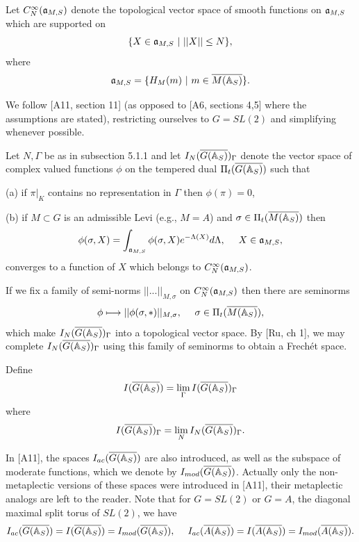 Let $C_N^\infty({\frak{a}}_{M,S})$ denote the topological vector space of
smooth functions on ${\frak{a}}_{M,S}$ which are supported on
\[
\{X\in {\frak{a}}_{M,S}\ |\ ||X||\leq N\},
\]
where
\begin{equation}
{\frak{a}}_{M,S}
=\{H_M(m)\ |\ m\in \overline{M({\Bbb{A}}_S)}\}.
\end{equation}

We follow [A11, section 11] (as opposed to [A6, sections 4,5] where
the assumptions are stated), restricting ourselves to
$G=SL(2)$ and simplifying whenever possible.

 Let $N,\Gamma$ be as in subsection 5.1.1 and let
$I_N(\overline{G({\Bbb{A}}_S)})_\Gamma$ denote the vector
space of complex valued functions $\phi$
on the tempered dual $\Pi_t(\overline{G({\Bbb{A}}_S)})$ such
that

(a) if $\pi|_K$ contains no representation in $\Gamma$ then
$\phi (\pi)=0$,

(b) if $M\subset G$ is an admissible Levi (e.g., $M=A$) and
$\sigma\in \Pi_t(\overline{M({\Bbb{A}}_S)})$ then
\begin{equation}
\phi(\sigma,X)
=\int_{{\frak{a}}_{M,S}}
\phi(\sigma,X)e^{-\Lambda (X)}d\Lambda ,\ \ \ \ X\in {\frak{a}}_{M,S},
\end{equation}
converges to a function of $X$ which belongs to
$C_N^\infty({\frak{a}}_{M,S})$.

If we fix a family of semi-norms $||...||_{M,\sigma}$
on $C_N^\infty({\frak{a}}_{M,S})$ then there are seminorms
\begin{equation}
\phi\longmapsto ||\phi(\sigma,*)||_{M,\sigma},\ \ \ \
\sigma\in \Pi_t(\overline{M({\Bbb{A}}_S)}),
\end{equation}
which make $I_N(\overline{G({\Bbb{A}}_S)})_\Gamma$ into a topological vector space.
By [Ru, ch 1], we may complete
$I_N(\overline{G({\Bbb{A}}_S)})_\Gamma$ using this family of seminorms to
obtain a Frech\'et space.

Define
\begin{equation}
I(\overline{G({\Bbb{A}}_S)})
=\lim_{\Gamma}
I(\overline{G({\Bbb{A}}_S)})_\Gamma
\end{equation}
where
\[
I(\overline{G({\Bbb{A}}_S)})_\Gamma
=\lim_N
I_N(\overline{G({\Bbb{A}}_S)})_\Gamma .
\]

In [A11], the spaces $I_{ac}(\overline{G({\Bbb{A}}_S)})$ are also
introduced, as well as the subspace of moderate functions,
which we denote by $I_{mod}(\overline{G({\Bbb{A}}_S)})$.
Actually only the non-metaplectic versions of these spaces
were introduced in [A11], their metaplectic analogs are left
to the reader.
Note that for $G=SL(2)$ or $G=A$, the diagonal maximal split torus
of $SL(2)$, we have
\[
I_{ac}(\overline{G({\Bbb{A}}_S)})=I(\overline{G({\Bbb{A}}_S)})
=I_{mod}(\overline{G({\Bbb{A}}_S)}),
\ \ \ \ 
I_{ac}(\overline{A({\Bbb{A}}_S)})
=I(\overline{A({\Bbb{A}}_S)})
=I_{mod}(\overline{A({\Bbb{A}}_S)}).
\]

